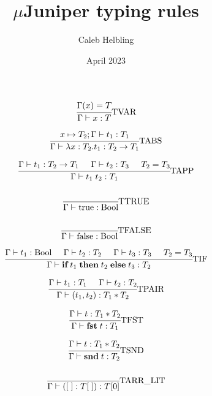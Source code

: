 \documentclass{article}
\title{$\mu$Juniper typing rules}
\author{Caleb Helbling}
\date{April 2023}
\begin{document}
\maketitle

\begin{equation}
\cfrac{\Gamma(x) = T}{\Gamma \vdash x : T}\text{TVAR}
\end{equation}

\begin{equation}
\cfrac{x \mapsto T_2; \Gamma \vdash t_1 : T_1}{\Gamma \vdash \lambda x : T_2 . t_1 : T_2 \rightarrow T_1}\text{TABS}
\end{equation}

\begin{equation}
\cfrac
{\Gamma \vdash t_1 : T_2 \rightarrow T_1 \;\;\;\;\; \Gamma \vdash t_2 : T_3 \;\;\;\;\; T_2 = T_3}
{\Gamma \vdash t_1 \; t_2 : T_1}\text{TAPP}
\end{equation}

\begin{equation}
\cfrac{}{\Gamma \vdash \text{true} : \text{Bool}}\text{TTRUE}
\end{equation}

\begin{equation}
\cfrac{}{\Gamma \vdash \text{false} : \text{Bool}}\text{TFALSE}
\end{equation}

\begin{equation}
\cfrac{
\Gamma \vdash t_1 : \text{Bool} \;\;\;\;\; \Gamma \vdash t_2 : T_2 \;\;\;\;\; \Gamma \vdash t_3 : T_3 \;\;\;\;\; T_2 = T_3
}
{\Gamma \vdash \textbf{if}\; t_1\; \textbf{then}\; t_2\; \textbf{else}\; t_3 : T_2}\text{TIF}
\end{equation}

\begin{equation}
\cfrac
{\Gamma \vdash t_1 : T_1 \;\;\;\;\; \Gamma \vdash t_2 : T_2}
{\Gamma \vdash (t_1, t_2) : T_1 * T_2}\text{TPAIR}
\end{equation}

\begin{equation}
\cfrac
{\Gamma \vdash t : T_1 * T_2}
{\Gamma \vdash \textbf{fst}\; t : T_1}\text{TFST}
\end{equation}

\begin{equation}
\cfrac
{\Gamma \vdash t : T_1 * T_2}
{\Gamma \vdash \textbf{snd}\; t : T_2}\text{TSND}
\end{equation}

\begin{equation}
\cfrac
{}
{\Gamma \vdash ([\;] : T[\;]) : T[0]}\text{TARR\_LIT}
\end{equation}
\end{document}
